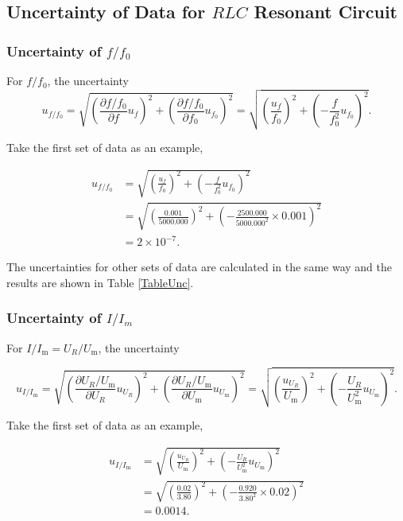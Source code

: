 \documentclass{article}
\begin{document}
\subsection{Uncertainty of Data for $RLC$ Resonant Circuit}

\subsubsection*{Uncertainty of $f/f_0$}

For $f/f_0$, the uncertainty
$$u_{f/f_0} = \sqrt{(\frac{\partial f/f_0}{\partial f}u_f)^2 + (\frac{\partial f/f_0}{\partial f_0}u_{f_0})^2} = \sqrt{(\frac{u_f}{f_0})^2 + (-\frac{f}{f_0^2}u_{f_0})^2}.$$

Take the first set of data as an example,

\begin{align*}
    u_{f/f_0} & = \sqrt{(\frac{u_f}{f_0})^2 + (-\frac{f}{f_0^2}u_{f_0})^2}                         \\
              & = \sqrt{(\frac{0.001}{5000.000})^2 + (-\frac{2500.000}{5000.000^2}\times 0.001)^2} \\
              & = 2\times 10^{-7}.
\end{align*}

The uncertainties for other sets of data are calculated in the same way and the results are shown in Table \ref{TableUnc}.

\subsubsection*{Uncertainty of $I/I_m$}
For $I/I_\text{m} = U_R/U_\text{m}$, the uncertainty

$$u_{I/I_\text{m}} = \sqrt{(\frac{\partial U_R/U_\text{m}}{\partial U_R}u_{U_R})^2 + (\frac{\partial U_R/U_\text{m}}{\partial U_\text{m}}u_{U_\text{m}})^2} = \sqrt{(\frac{u_{U_R}}{U_\text{m}})^2 + (-\frac{U_R}{U_\text{m}^2}u_{U_\text{m}})^2}.$$

Take the first set of data as an example,

\begin{align*}
    u_{I/I_\text{m}} & = \sqrt{(\frac{u_{U_R}}{U_\text{m}})^2 + (-\frac{U_R}{U_\text{m}^2}u_{U_\text{m}})^2} \\
                     & = \sqrt{(\frac{0.02}{3.80})^2 + (-\frac{0.920}{3.80^2}\times 0.02)^2}                 \\
                     & = 0.0014.
\end{align*}
\end{document}
